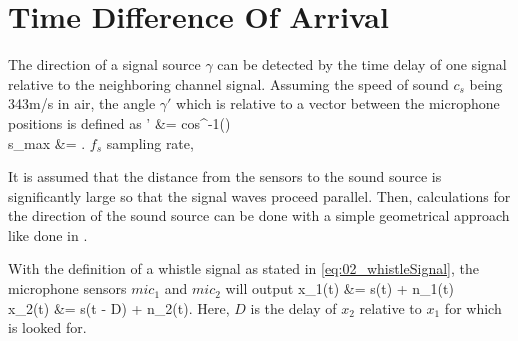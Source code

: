 \section{Time Difference Of Arrival}

The direction of a signal source $\gamma$ can be detected by the time delay of
one signal relative to the neighboring channel signal.
Assuming the speed of sound $c_s$ being 343\si{m/s} in air, the angle
$\gamma'$ which is relative to a vector between the microphone positions
is defined as
\bsub \bal
    \gamma' &= cos^{-1}()
    \label{eq:02_tdoaAngle}\\
    s_{max} &= .
\eal \esub
$f_s$ sampling rate, 

It is assumed that the distance from the sensors to the sound source is
significantly large so that the signal waves proceed parallel.
Then, calculations for the direction of the sound source can be done with a simple
geometrical approach like done in \cite{Valin_Michaud}.

With the definition of a whistle signal as stated in \cref{eq:02_whistleSignal},
the microphone sensors $mic_1$ and $mic_2$ will output
\bsub \bal
    x_1(t) &= s(t) + n_1(t)\\
    x_2(t) &= \alpha s(t - D) + n_2(t).
\eal \esub
\label{eq:02_signalTimeDomain}
Here, $D$ is the delay of $x_2$ relative to $x_1$ for which is looked for.